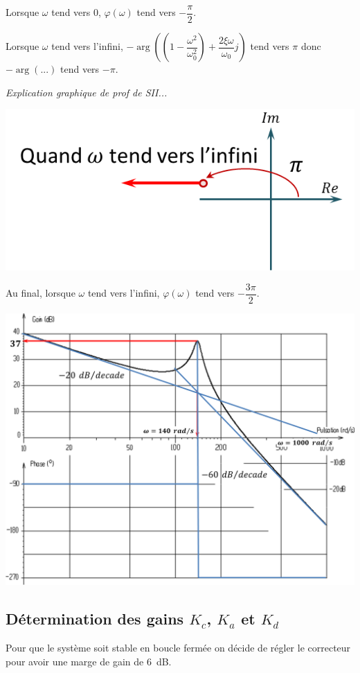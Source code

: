 \documentclass[10pt,fleqn]{article} %
\begin{document}
\begin{multicols}{2}
\begin{corrige}
Lorsque $\omega$ tend vers 0, $\varphi\left(\omega\right)$ 
tend vers $-\dfrac{\pi}{2}$. 

Lorsque $\omega$ tend vers l'infini,
$-\arg  \left( \left( 1 - \dfrac{\omega^2}{\omega_0^2}\right) + \dfrac{2\xi\omega}{\omega_0} j \right)$ tend vers $\pi$ donc $-\arg(...)$ tend vers $-\pi$.

\textit{Explication graphique de prof de SII...}
\begin{center}
\includegraphics[width=.6\linewidth]{images/cor_02}
\end{center}

Au final, lorsque $\omega$ tend vers l'infini, $\varphi(\omega)$ tend vers $-\dfrac{3\pi}{2}$.

\end{corrige}

\begin{center}
\includegraphics[width=.8\linewidth]{images/cor_03}
\end{center}


\subsection*{Détermination des gains $K_c$, $K_a$ et $K_d$}
Pour que le système soit stable en boucle fermée on décide de régler le correcteur pour avoir une marge de gain de \SI{6}{dB}.


\end{multicols}
\end{document}
